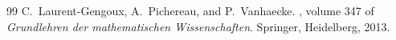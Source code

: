 \documentclass[10pt,a4paper]{amsart}
\begin{document}
\begin{thebibliography}{99}
 C.~Laurent-Gengoux, A.~Pichereau, and P.~Vanhaecke. , volume 347 of {\em Grundlehren der mathematischen {W}issenschaften}. \newblock Springer, Heidelberg, 2013.
\end{thebibliography}
\end{document}
